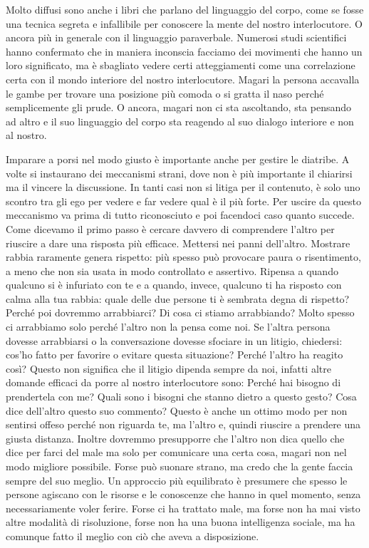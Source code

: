 \documentclass[12pt]{book} %
\begin{document}
Molto diffusi sono anche i libri che parlano del linguaggio del corpo, come se fosse una tecnica segreta e infallibile
per conoscere la mente del nostro interlocutore. O ancora più in generale con il linguaggio paraverbale. Numerosi studi
scientifici hanno confermato che in maniera inconscia facciamo dei movimenti che hanno un loro significato, ma è
sbagliato vedere certi atteggiamenti come una correlazione certa con il mondo interiore del nostro interlocutore.
Magari la persona accavalla le gambe per trovare una posizione più comoda o si gratta il naso perché semplicemente gli
prude. O ancora, magari non ci sta ascoltando, sta pensando ad altro e il suo linguaggio del corpo sta reagendo al suo
dialogo interiore e non al nostro.

Imparare a porsi nel modo giusto è importante anche per gestire le diatribe. A volte si instaurano dei meccanismi
strani, dove non è più importante il chiarirsi ma il vincere la discussione. 
In tanti casi non si litiga per il contenuto, è solo uno scontro tra gli ego per vedere e far vedere qual è il più forte. 
Per uscire da questo meccanismo va prima di tutto riconosciuto e poi facendoci caso quanto
succede. Come dicevamo il primo passo è cercare davvero di comprendere l'altro per riuscire a dare
una risposta più efficace. Mettersi nei panni dell'altro. 
Mostrare rabbia raramente genera rispetto: più spesso può provocare paura o risentimento, a meno che non sia usata in modo controllato e assertivo. Ripensa a quando qualcuno si è infuriato con te e a quando, invece, qualcuno ti ha risposto con calma alla tua rabbia: quale delle due persone ti è sembrata degna di rispetto? 
Perché poi dovremmo arrabbiarci? Di cosa ci stiamo arrabbiando? Molto spesso ci arrabbiamo solo perché l'altro non la pensa come noi.
Se l'altra persona dovesse arrabbiarsi o la conversazione dovesse sfociare in un litigio, chiedersi: cos'ho fatto per favorire o evitare questa
situazione? Perché l'altro ha reagito così? 
Questo non significa che il litigio dipenda sempre da noi, infatti altre domande efficaci da porre al nostro interlocutore sono:
Perché hai bisogno di prendertela con me? Quali sono i bisogni che stanno dietro a questo gesto?
Cosa dice dell'altro questo suo commento?
Questo è anche un ottimo modo per non sentirsi offeso perché non riguarda te, ma l'altro e, quindi riuscire a prendere una giusta distanza.
Inoltre dovremmo presupporre che l'altro non dica quello che dice per farci del male ma solo per comunicare una certa cosa, magari non nel modo migliore possibile. 
Forse può suonare strano, ma credo che la gente faccia sempre del suo meglio. Un approccio più equilibrato è presumere che spesso le persone agiscano con le risorse e le conoscenze che hanno in quel momento, senza necessariamente voler ferire. Forse ci ha trattato male, ma forse non ha mai visto altre modalità di risoluzione, forse non ha una buona intelligenza sociale, ma ha comunque fatto il meglio con ciò che aveva a disposizione.
\end{document}
